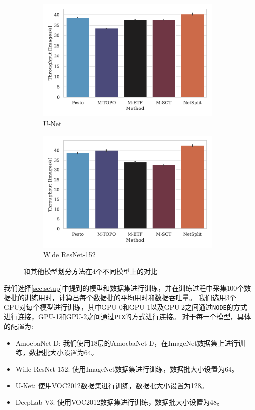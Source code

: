 \begin{figure}[ht]
\begin{subfigure}[b]{0.45\textwidth}
	  \includegraphics[width=\textwidth]{./figure/5-evaluation/result-unet.pdf}
	  \caption{U-Net}
	\end{subfigure}
	\quad
	\begin{subfigure}[b]{0.45\textwidth}
	  \includegraphics[width=\textwidth]{./figure/5-evaluation/result-wide-resnet152.pdf}
	  \caption{Wide ResNet-152}
	\end{subfigure}
	\caption{\sys{}和其他模型划分方法在4个不同模型上的对比}
	\label{fig:result}
\end{figure}

我们选择\ref{sec:setup}中提到的模型和数据集进行训练，并在训练过程中采集100个数据批的训练用时，计算出每个数据批的平均用时和数据吞吐量。
我们选用3个GPU对每个模型进行训练，其中GPU-0和GPU-1以及GPU-2之间通过\texttt{NODE}的方式进行连接，GPU-1和GPU-2之间通过\texttt{PIX}的方式进行连接。
对于每一个模型，具体的配置为:
\begin{itemize}
	\item AmoebaNet-D: 我们使用18层的AmoebaNet-D，在ImageNet数据集上进行训练，数据批大小设置为64。
	\item Wide ResNet-152: 使用ImageNet数据集进行训练，数据批大小设置为64。
	\item U-Net: 使用VOC2012数据集进行训练，数据批大小设置为128。
	\item DeepLab-V3: 使用VOC2012数据集进行训练，数据批大小设置为48。
\end{itemize}

